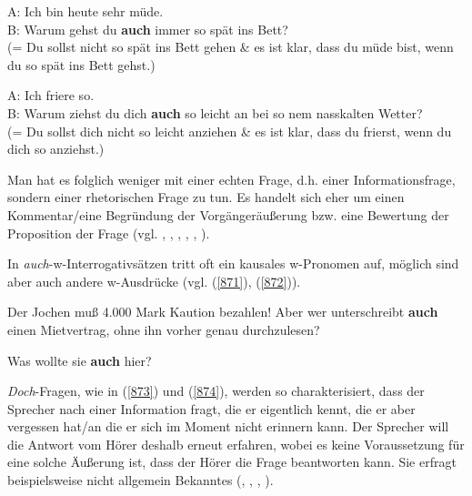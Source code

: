 {\begin{exe}
	\ex\label{869}
	A: Ich bin heute sehr müde.\\
	B: Warum gehst du \textbf{auch} immer so spät ins Bett?		
	\hfill\hbox {\citet[89]{Helbig1990}}\\
	(= Du sollst nicht so spät ins Bett gehen \& es ist klar, dass du müde bist, wenn du so spät ins Bett gehst.)		
\end{exe}	

\begin{exe}
	\ex\label{870}
	A: Ich friere so.\\
	B: Warum ziehst du dich \textbf{auch} so leicht an bei so nem nasskalten Wetter?
	\newline	
	\hbox{}\hfill\hbox {\citet[218]{Franck1980}}\\
	(= Du sollst dich nicht so leicht anziehen \& es ist klar, dass du frierst, wenn du dich so anziehst.)		
\end{exe}	
Man hat es folglich weniger mit einer echten Frage, d.h. einer  Informationsfrage, sondern einer rhetorischen Frage  zu tun. Es handelt sich eher um einen Kommentar/eine Begründung der Vorgängeräußerung bzw. eine Bewertung der Proposition der Frage (vgl. \citealt[218-219]{Franck1980}, \citealt[51-54]{Dahl1988}, \citealt[158-159]{Thurmair1989}, \citealt[89]{Helbig1990}, \citealt[231]{Karagjosova2004}, \citealt[77, 202]{Kwon2005}).

In \textit{auch}-w-Interrogativsätzen tritt oft ein kausales w-Pronomen auf, möglich sind aber auch andere w-Ausdrücke (vgl. (\ref{871}), (\ref{872})).

\begin{exe}
	\ex\label{871}
	Der Jochen muß 4.000 Mark Kaution bezahlen! Aber wer unterschreibt \textbf{auch} einen Mietvertrag, ohne ihn vorher genau durchzulesen?	
	\newline
	\hbox{}\hfill\hbox {\citet[159]{Thurmair1989}}
\end{exe}
\vspace{-0.65cm}	
\begin{exe}
	\ex\label{872}
	Was wollte sie \textbf{auch} hier?
	\hfill\hbox {\citet[51]{Dahl1988}}	
\end{exe}
\textit{Doch}-Fragen, wie in (\ref{873}) und (\ref{874}), werden so charakterisiert, dass der Sprecher nach einer Information fragt, die er eigentlich kennt, die er aber vergessen hat/an die er sich im Moment nicht erinnern kann. Der Sprecher will die Antwort vom Hörer deshalb erneut erfahren, wobei es keine Voraussetzung für eine solche Äußerung ist, dass der Hörer die Frage beantworten kann. Sie erfragt beispiels\-weise nicht allgemein Bekanntes (\citealt[88]{Dahl1988}, \citealt[117]{Thurmair1989}, \citealt[114]{Helbig1990}, \citealt[204]{Kwon2005}).

}
